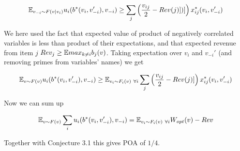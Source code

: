 $${\mathbb{E}}_{v_{-i}\sim F(v|v_i)}u_i(b^*(v_i,v_{-i}'),v_{-i}) \geq \sum_j \left ( \frac{v_{ij}}{2}-Rev(j)])]\right)x^*_{ij}(v_i,v_{-i}')$$


We here used the fact that expected value of product of negatively correlated variables is less than product of their expectations, and that expected revenue from item $j$ $Rev_j\geq {\mathbb{E}} max_{k\neq i} b_j(v)$. Taking expectation over $v_i$ and $v_{-i}'$ (and removing primes from variables' names) we get

$${\mathbb{E}}_{v\sim F(v)}u_i(b^*(v_i,v_{-i}'),v_{-i}) \geq {\mathbb{E}}_{v_i\sim F_i(v)\ \forall i} \sum_j \left ( \frac{v_{ij}}{2}-Rev(j)]\right)x^*_{ij}(v_i,v_{-i}')$$

Now we can sum up 

$${\mathbb{E}}_{v\sim F(v)}\sum_i u_i(b^*(v_i,v_{-i}'),v_{-i}) = {\mathbb{E}}_{v_i\sim F_i(v)\ \forall i}W_{opt}(v) - Rev$$

Together with Conjecture 3.1 this gives POA of $1/4$.

